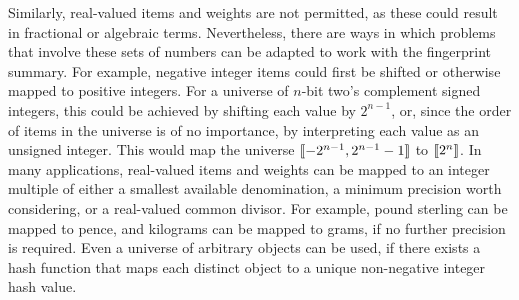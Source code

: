 Similarly, real-valued items and weights are not permitted, as these could result in fractional or algebraic terms.
Nevertheless, there are ways in which problems that involve these sets of numbers can be adapted to work with the fingerprint summary.
For example, negative integer items could first be shifted or otherwise mapped to positive integers.
For a universe of \( n \)-bit two's complement signed integers, this could be achieved by shifting each value by \( 2^{n - 1} \), or, since the order of items in the universe is of no importance, by interpreting each value as an unsigned integer.
This would map the universe \( \llbracket-2^{n - 1}, 2^{n - 1} - 1\rrbracket \) to \( \llbracket2^{n}\rrbracket \).
In many applications, real-valued items and weights can be mapped to an integer multiple of either a smallest available denomination, a minimum precision worth considering, or a real-valued common divisor.
For example, pound sterling can be mapped to pence, and kilograms can be mapped to grams, if no further precision is required.
Even a universe of arbitrary objects can be used, if there exists a hash function that maps each distinct object to a unique non-negative integer hash value.
